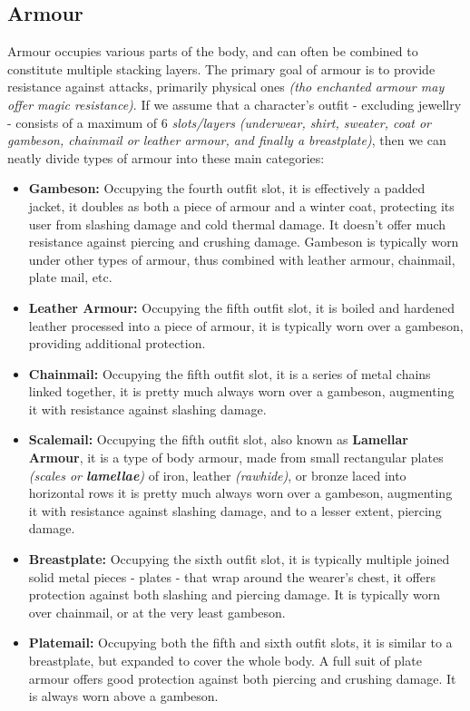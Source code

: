 \documentclass[openany,11pt,a4paper]{book}
\begin{document}
\subsection{Armour}
Armour occupies various parts of the body, and can often be combined to constitute multiple stacking layers. The primary goal of armour is to provide resistance against attacks, primarily physical ones \textit{(tho enchanted armour may offer magic resistance)}. If we assume that a character's outfit - excluding jewellry - consists of a maximum of 6 \textit{slots/layers} \textit{(underwear, shirt, sweater, coat or gambeson, chainmail or leather armour, and finally a breastplate)}, then we can neatly divide types of armour into these main categories:
\begin{itemize}
\item \textbf{Gambeson:} Occupying the fourth outfit slot, it is effectively a padded jacket, it doubles as both a piece of armour and a winter coat, protecting its user from slashing damage and cold thermal damage. It doesn't offer much resistance against piercing and crushing damage. Gambeson is typically worn under other types of armour, thus combined with leather armour, chainmail, plate mail, etc.
\item \textbf{Leather Armour:} Occupying the fifth outfit slot, it is boiled and hardened leather processed into a piece of armour, it is typically worn over a gambeson, providing additional protection.
\item \textbf{Chainmail:} Occupying the fifth outfit slot, it is a series of metal chains linked together, it is pretty much always worn over a gambeson, augmenting it with resistance against slashing damage.
\item \textbf{Scalemail:} Occupying the fifth outfit slot, also known as \textbf{Lamellar Armour}, it is a type of body armour, made from small rectangular plates \textit{(scales or \textbf{lamellae})} of iron, leather \textit{(rawhide)}, or bronze laced into horizontal rows it is pretty much always worn over a gambeson, augmenting it with resistance against slashing damage, and to a lesser extent, piercing damage.
\item \textbf{Breastplate:} Occupying the sixth outfit slot, it is typically multiple joined solid metal pieces - plates - that wrap around the wearer's chest, it offers protection against both slashing and piercing damage. It is typically worn over chainmail, or at the very least gambeson.
\item \textbf{Platemail:} Occupying both the fifth and sixth outfit slots, it is similar to a breastplate, but expanded to cover the whole body. A full suit of plate armour offers good protection against both piercing and crushing damage. It is always worn above a gambeson.
\end{itemize}
\end{document}

